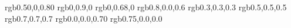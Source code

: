 

\usepackage{color}
\usepackage{xcolor}
\definecolor{purple}   {rgb}{0.50,0,0.80}    %
\definecolor{lime}     {rgb}{0,0.9,0}        %
\definecolor{green}    {rgb}{0,0.68,0}       %
\definecolor{magenta}  {rgb}{0.8,0.0,0.6}    %
\definecolor{dgrey}     {rgb}{0.3,0.3,0.3}    %
\definecolor{grey}     {rgb}{0.5,0.5,0.5}    %
\definecolor{lgrey}    {rgb}{0.7,0.7,0.7}    %
\definecolor{darkblue} {rgb}{0.0,0.0,0.70}   %
\definecolor{darkred}  {rgb}{0.75,0.0,0.0}   %





